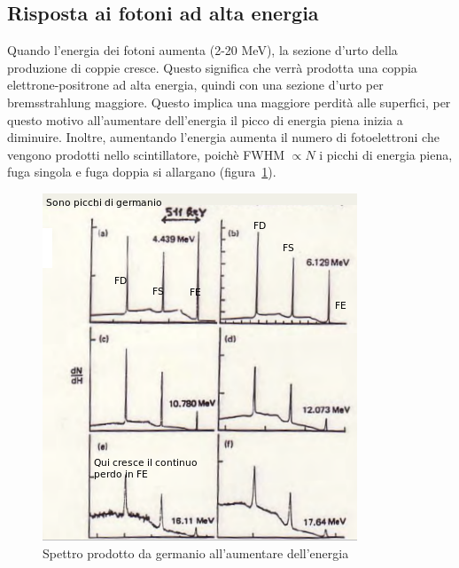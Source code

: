 \subsection{Risposta ai fotoni ad alta energia}
Quando l'energia dei fotoni aumenta (2-20 MeV), la sezione d'urto della produzione di coppie cresce.
Questo significa che verr\`a prodotta una coppia elettrone-positrone ad alta energia, quindi con una sezione d'urto per
bremsstrahlung maggiore.
Questo implica una maggiore perdit\`a alle superfici, per questo motivo all'aumentare dell'energia il picco di energia piena inizia a diminuire.
Inoltre, aumentando l'energia aumenta il numero di fotoelettroni che vengono prodotti nello scintillatore, poich\`e
FWHM $\propto N$ i picchi di energia piena, fuga singola e fuga doppia si allargano (figura~\ref{fig:confrontoAlteEnergie}).
\begin{figure}[htbp]
\begin{center}
\includegraphics[scale=1]{./Immagini/ConfrontoAlteEnergie.png}
\caption{Spettro prodotto da germanio all'aumentare dell'energia}
\label{fig:confrontoAlteEnergie}
\end{center}
\end{figure}
